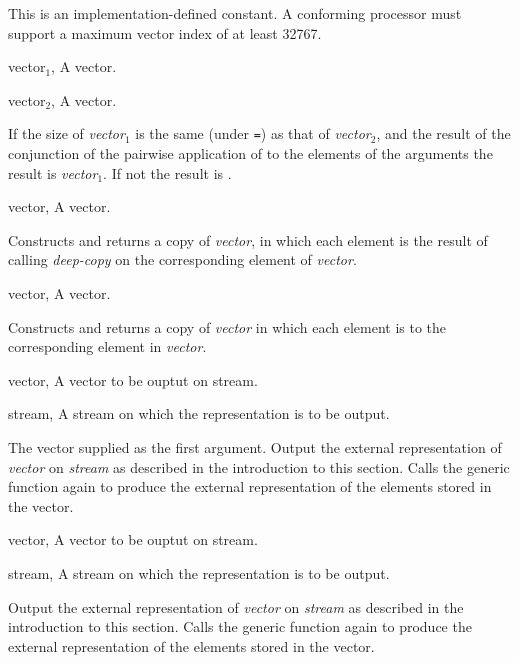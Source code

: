 \begin{optDefinition}
%
\remarks%
This is an implementation-defined constant.  A conforming processor must support
a maximum vector index of at least
32767.

%
\begin{specargs}
    \item[vector$_1$, \classref{vector}] A vector.
    \item[vector$_2$, \classref{vector}] A vector.
\end{specargs}
%
\result%
If the size of {\em vector$_1$} is the same (under {\tt =}) as that of {\em
    vector$_2$}, and the result of the conjunction of the pairwise application
of  to the elements of the arguments \true{} the result is
{\em vector$_1$}.  If not the result is \nil{}.

%
\begin{specargs}
    \item[vector, \classref{vector}] A vector.
\end{specargs}
%
\result%
Constructs and returns a copy of {\em vector}, in which each element is the
result of calling {\em deep-copy\/} on the corresponding element of {\em
    vector}.

%
\begin{specargs}
    \item[vector, \classref{vector}] A vector.
\end{specargs}
%
\result%
Constructs and returns a copy of {\em vector\/} in which each element is
 to the corresponding element in {\em vector}.

%
\begin{specargs}
    \item[vector, \classref{vector}]
    A vector to be ouptut on stream.
    \item[stream, \classref{stream}]
    A stream on which the representation is to be output.
\end{specargs}
%
\result%
The vector supplied as the first argument.
%
\remarks%
Output the external representation of {\em vector\/} on {\em stream\/} as
described in the introduction to this section.  Calls the generic function again
to produce the external representation of the elements stored in the vector.

%
\begin{specargs}
    \item[vector, \classref{vector}] A vector to be ouptut on stream.
    \item[stream, \classref{stream}] A stream on which the representation is to
    be output.
\end{specargs}
%
\remarks%
Output the external representation of {\em vector\/} on {\em stream\/} as
described in the introduction to this section.  Calls the generic function again
to produce the external representation of the elements stored in the vector.
%
\end{optDefinition}
